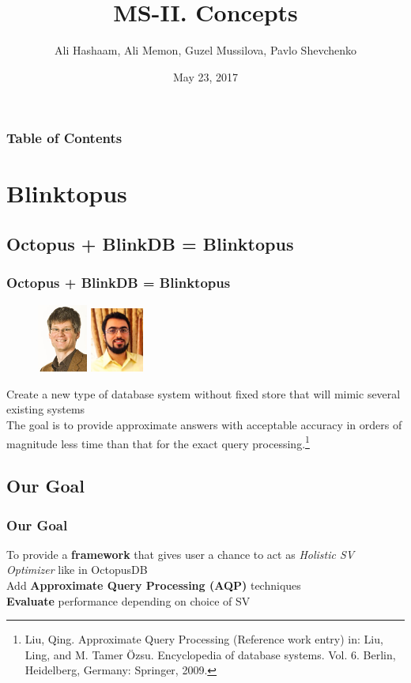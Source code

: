 \documentclass{beamer}
\title{MS-II. Concepts}
\author{Ali Hashaam, Ali Memon, Guzel Mussilova, Pavlo Shevchenko}
\date{May 23, 2017}
\institute{Scientific Project: Databases for Multi-Dimensional Data, Genomics and Modern Hardware}
\begin{document}
\begin{frame}[plain]
 \titlepage
\end{frame}

\begin{frame}
\frametitle{Table of Contents}
\tableofcontents 
\end{frame}

\section{Blinktopus}

\subsection{Octopus + BlinkDB = Blinktopus}

\begin{frame}
\frametitle{Octopus + BlinkDB = Blinktopus}
\begin{figure}
\includegraphics[width=1.65cm]{img/jensdittrich.jpg}
\vspace{0.25 cm}
\includegraphics[width=1.75cm]{img/Mozafaribarzan.JPG}
\end{figure}
Create a new type of database system without fixed store that will mimic several existing systems\\
\vspace{2.2 cm}
The goal is to provide approximate answers with acceptable accuracy in orders of magnitude less time than that for the exact query processing.\footnote{\tiny Liu, Qing. Approximate Query Processing (Reference work entry) in: Liu, Ling, and M. Tamer Özsu. Encyclopedia of database systems. Vol. 6. Berlin, Heidelberg, Germany: Springer, 2009.}\\
\end{frame}

\subsection{Our Goal}
\begin{frame}
\frametitle{Our Goal}
To provide a \textbf{framework} that gives user a chance to act as \textit{Holistic SV Optimizer} like in OctopusDB \\
Add \textbf{Approximate Query Processing (AQP)} techniques\\
\textbf{Evaluate} performance depending on choice of SV
\end{frame}
\end{document}
